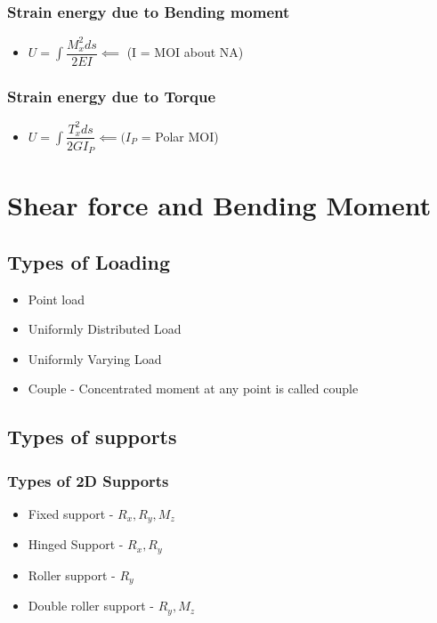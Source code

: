 \documentclass[8pt]{report}
\begin{document}
		\subsection{Strain energy due to Bending moment}
			\begin{itemize}
				\item $\boxed{U = \int\dfrac{M_x^2ds}{2EI}}\impliedby$ (I = MOI about NA)
			\end{itemize}\hrulefill
		\subsection{Strain energy due to Torque}
			\begin{itemize}
				\item $\boxed{U = \int\dfrac{T_x^2ds}{2GI_P}}\impliedby (I_P$ = Polar MOI)
			\end{itemize}\hrulefill
\chapter{Shear force and Bending Moment}
	\section{Types of Loading}
		\begin{itemize}
			\item Point load
			\item Uniformly Distributed Load
			\item Uniformly Varying Load
			\item Couple - Concentrated moment at any point is called couple
		\end{itemize}\hrulefill
	\section{Types of supports}	
		\subsection{Types of 2D Supports}
			\begin{itemize}
				\item Fixed support - $R_x,R_y,M_z$
				\item Hinged Support - $R_x,R_y$
				\item Roller support - $R_y$
				\item Double roller support - $R_y,M_z$
			\end{itemize}
\end{document}
